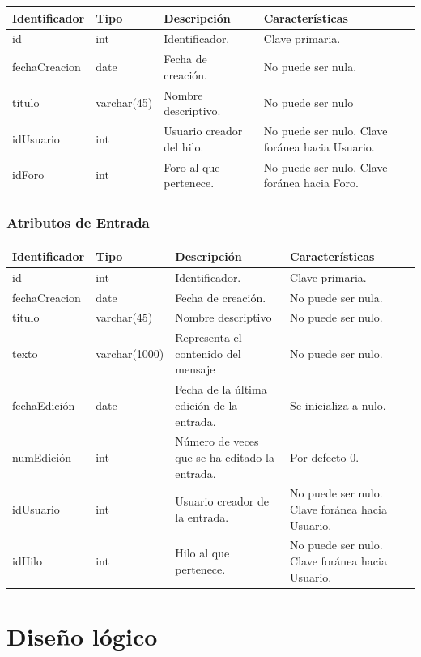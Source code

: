 \documentclass[12pt, a4paper, titlepage]{article}
\begin{document}
\begin{tabular}{|p{3cm}|p{2cm}|p{4cm}|p{4cm}|}
	\hline
	\textbf{Identificador} & \textbf{Tipo} & \textbf{Descripción} & \textbf{Características} \\ \hline
	id & int & Identificador. & Clave primaria. \\ 
	\hline
	fechaCreacion & date & Fecha de creación. & No puede ser nula. \\ \hline
	titulo & varchar(45) & Nombre descriptivo. & No puede ser nulo \\
	\hline	
	idUsuario & int & Usuario creador del hilo. & No puede ser nulo. Clave foránea hacia Usuario. \\ \hline
	idForo & int & Foro al que pertenece. & No puede ser nulo. Clave foránea hacia Foro.\\ 
	\hline
\end{tabular}


\subsubsection{Atributos de Entrada}

\begin{tabular}{|p{3cm}|p{}|p{4cm}|p{4cm}|}
	\hline
	\textbf{Identificador} & \textbf{Tipo} & \textbf{Descripción} & \textbf{Características} \\ \hline
	id & int & Identificador. & Clave primaria. \\ 
	\hline
	fechaCreacion & date & Fecha de creación. & No puede ser nula. \\ \hline
	titulo & varchar(45) & Nombre descriptivo & No puede ser nulo. \\
	\hline	
	texto & varchar(1000) & Representa el contenido del mensaje & No puede ser nulo. \\
	\hline
	fechaEdición & date & Fecha de la última edición de la entrada. & Se inicializa a nulo. \\
	\hline
	numEdición & int & Número de veces que se ha editado la entrada. & Por defecto 0. \\
	\hline
	idUsuario & int & Usuario creador de la entrada. & No puede ser nulo. Clave foránea hacia Usuario. \\ 
	\hline
	idHilo & int & Hilo al que pertenece. & No puede ser nulo. Clave foránea hacia Usuario. \\ 
	\hline
\end{tabular}

\pagebreak
\section{Diseño lógico}
\end{document}
